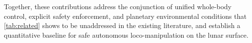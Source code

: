 Together, these contributions address the conjunction of unified whole-body control, explicit safety enforcement, and planetary environmental conditions that \cref{tab:related} shows to be unaddressed in the existing literature, and establish a quantitative baseline for safe autonomous loco-manipulation on the lunar surface.